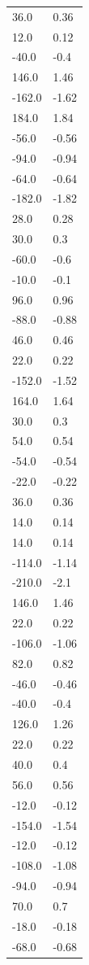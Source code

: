 \begin{longtable}{ll}
36.0 & 0.36 \\
12.0 & 0.12 \\
-40.0 & -0.4 \\
146.0 & 1.46 \\
-162.0 & -1.62 \\
184.0 & 1.84 \\
-56.0 & -0.56 \\
-94.0 & -0.94 \\
-64.0 & -0.64 \\
-182.0 & -1.82 \\
28.0 & 0.28 \\
30.0 & 0.3 \\
-60.0 & -0.6 \\
-10.0 & -0.1 \\
96.0 & 0.96 \\
-88.0 & -0.88 \\
46.0 & 0.46 \\
22.0 & 0.22 \\
-152.0 & -1.52 \\
164.0 & 1.64 \\
30.0 & 0.3 \\
54.0 & 0.54 \\
-54.0 & -0.54 \\
-22.0 & -0.22 \\
36.0 & 0.36 \\
14.0 & 0.14 \\
14.0 & 0.14 \\
-114.0 & -1.14 \\
-210.0 & -2.1 \\
146.0 & 1.46 \\
22.0 & 0.22 \\
-106.0 & -1.06 \\
82.0 & 0.82 \\
-46.0 & -0.46 \\
-40.0 & -0.4 \\
126.0 & 1.26 \\
22.0 & 0.22 \\
40.0 & 0.4 \\
56.0 & 0.56 \\
-12.0 & -0.12 \\
-154.0 & -1.54 \\
-12.0 & -0.12 \\
-108.0 & -1.08 \\
-94.0 & -0.94 \\
70.0 & 0.7 \\
-18.0 & -0.18 \\
-68.0 & -0.68 \\

\end{longtable}
